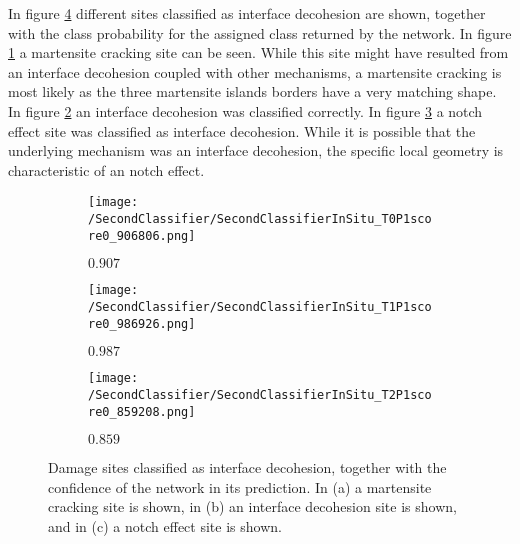 In figure \ref{fig:InSituInterfaceDecohesionSamples} different sites classified as interface decohesion are shown, together with the class probability for the assigned class returned by the network. In figure \ref{sub:InSituInterfaceDecohesionSamplesM} a martensite cracking site can be seen. While this site might have resulted from an interface decohesion coupled with other mechanisms, a martensite cracking is most likely as the three martensite islands borders have a very matching shape. In figure \ref{sub:InSituInterfaceDecohesionSamplesID} an interface decohesion was classified correctly. In figure \ref{sub:InSituInterfaceDecohesionSamplesN} a notch effect site was classified as interface decohesion. While it is possible that the underlying mechanism was an interface decohesion, the specific local geometry is characteristic of an notch effect.

\begin{figure}[H]
\centering
\begin{subfigure}{0.3\textwidth}
\texttt{[image: /SecondClassifier/SecondClassifierInSitu\_T0P1score0\_906806.png]}
\caption{$0.907$}
\label{sub:InSituInterfaceDecohesionSamplesM}
\end{subfigure}
\begin{subfigure}{0.3\textwidth}
\texttt{[image: /SecondClassifier/SecondClassifierInSitu\_T1P1score0\_986926.png]}
\caption{$0.987$}
\label{sub:InSituInterfaceDecohesionSamplesID}
\end{subfigure}
\begin{subfigure}{0.3\textwidth}
\texttt{[image: /SecondClassifier/SecondClassifierInSitu\_T2P1score0\_859208.png]}
\caption{$0.859$}
\label{sub:InSituInterfaceDecohesionSamplesN}
\end{subfigure}
\caption{Damage sites classified as interface decohesion, together with the confidence of the network in its prediction. In (a) a martensite cracking site is shown, in (b) an interface decohesion site is shown, and in (c) a notch effect site is shown. }
\label{fig:InSituInterfaceDecohesionSamples}
\end{figure}

